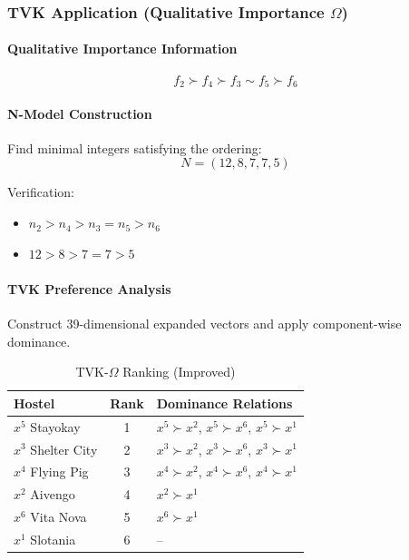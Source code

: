 \documentclass[conference]{IEEEtran}
\begin{document}
\subsubsection{TVK Application (Qualitative Importance $\Omega$)}

\paragraph{Qualitative Importance Information}

\begin{equation}
	f_2 \succ f_4 \succ f_3 \sim f_5 \succ f_6
\end{equation}

\paragraph{N-Model Construction}

Find minimal integers satisfying the ordering:
\begin{equation}
	N = (12, 8, 7, 7, 5)
\end{equation}

Verification:
\begin{itemize}
	\item $n_2 > n_4 > n_3 = n_5 > n_6$
	\item $12 > 8 > 7 = 7 > 5$ \checkmark
\end{itemize}

\paragraph{TVK Preference Analysis}

Construct 39-dimensional expanded vectors and apply component-wise dominance.

\begin{table}[H]
	\centering
	\caption{TVK-$\Omega$ Ranking (Improved)}
	\label{tab:hostel_tvk_improved}
	\begin{tabular}{|l|c|p{5cm}|}
		\hline
		\textbf{Hostel} & \textbf{Rank} & \textbf{Dominance Relations} \\
		\hline
		$x^5$ Stayokay & 1 & $x^5 \succ x^2$, $x^5 \succ x^6$, $x^5 \succ x^1$ \\
		$x^3$ Shelter City & 2 & $x^3 \succ x^2$, $x^3 \succ x^6$, $x^3 \succ x^1$ \\
		$x^4$ Flying Pig & 3 & $x^4 \succ x^2$, $x^4 \succ x^6$, $x^4 \succ x^1$ \\
		$x^2$ Aivengo & 4 & $x^2 \succ x^1$ \\
		$x^6$ Vita Nova & 5 & $x^6 \succ x^1$ \\
		$x^1$ Slotania & 6 & -- \\
		\hline
	\end{tabular}
\end{table}
\end{document}

